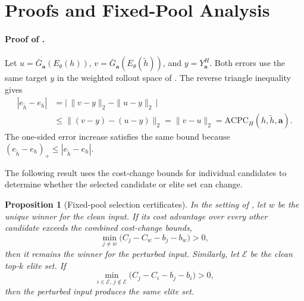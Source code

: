 \documentclass[10pt]{article}
\newtheorem{proposition}{Proposition}
\begin{document}
\FloatBarrier
\appendix
\section{Proofs and Fixed-Pool Analysis}\label{sec:appendix-acpc-proofs}

\paragraph{Proof of .}
Let $u=\bar G_{\mathbf a}(E_\theta(h))$,
$v=\bar G_{\mathbf a}(E_\theta(\tilde h))$, and $y=Y_{\mathbf a}^H$. Both
errors use the same target $y$ in the weighted rollout space of
. The reverse triangle inequality gives
\begin{align}
|e_{\tilde h}-e_h|
&=\bigl|\,\|v-y\|_2-\|u-y\|_2\,\bigr| \\
&\le \|(v-y)-(u-y)\|_2
=\|v-u\|_2
=\mathrm{ACPC}_H(h,\tilde h,\mathbf a).
\end{align}
The one-sided error increase satisfies the same bound because
$(e_{\tilde h}-e_h)_+\le|e_{\tilde h}-e_h|$.

The following result uses the cost-change bounds for individual candidates to
determine whether the selected candidate or elite set can change.

\begin{proposition}[Fixed-pool selection certificates]\label{prop:fixed-pool-certificates}
In the setting of , let $w$ be the unique
winner for the clean input. If its cost advantage over every other candidate
exceeds the combined cost-change bounds,
\begin{equation}
\min_{j\ne w}\bigl(C_j-C_w-b_j-b_w\bigr)>0,
\label{eq:top1-certificate-main}
\end{equation}
then it remains the winner for the perturbed input. Similarly, let $\mathcal
E$ be the clean top-$k$ elite set. If
\begin{equation}
\min_{i\in\mathcal E,\,j\notin\mathcal E}
\bigl(C_j-C_i-b_j-b_i\bigr)>0,
\label{eq:elite-certificate-main}
\end{equation}
then the perturbed input produces the same elite set.
\end{proposition}
\end{document}
